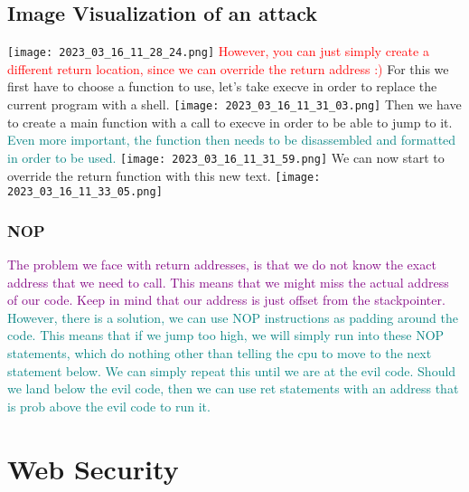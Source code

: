\documentclass[main.tex,fontsize=8pt,paper=a4,paper=portrait,DIV=calc,]{scrartcl}
\begin{document}
\subsection{Image Visualization of an attack}
\texttt{[image: 2023\_03\_16\_11\_28\_24.png]}\newline
\textcolor{red}{However, you can just simply create a different return location, since we can override the return address :)}\newline
For this we first have to choose a function to use, let's take execve in order to replace the current program with a shell.\newline
\texttt{[image: 2023\_03\_16\_11\_31\_03.png]}\newline
Then we have to create a main function with a call to execve in order to be able to jump to it.\newline
\textcolor{teal}{Even more important, the function then needs to be disassembled and formatted in order to be used.}\newline
\texttt{[image: 2023\_03\_16\_11\_31\_59.png]}\newline
We can now start to override the return function with this new text.\newline
\texttt{[image: 2023\_03\_16\_11\_33\_05.png]}

\subsubsection{NOP}
\textcolor{purple}{The problem we face with return addresses, is that we do not know the exact address that we need to call. This means that we might miss the actual address of our code.\newline
Keep in mind that our address is just offset from the stackpointer. }\newline
\textcolor{teal}{However, there is a solution, we can use NOP instructions as padding around the code. This means that if we jump too high, we will simply run into these NOP statements, which do nothing other than telling the cpu to move to the next statement below.\newline
We can simply repeat this until we are at the evil code.\newline
Should we land below the evil code, then we can use ret statements with an address that is prob above the evil code to run it.}


\section{Web Security}
\end{document}
